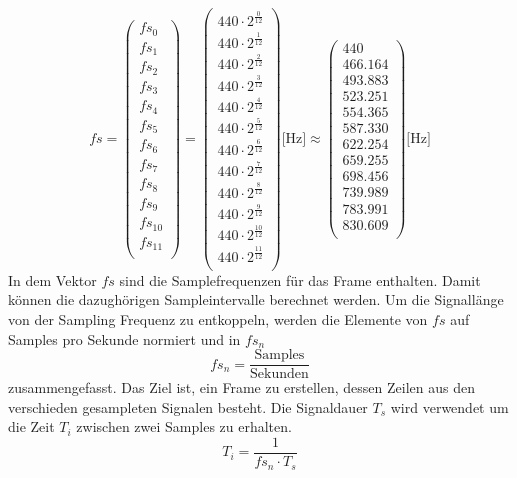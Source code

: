 \[
fs
=
 \begin{pmatrix}
fs_{0}\\[1mm]
fs_{1}\\[1mm]
fs_{2}\\[1mm]
fs_{3}\\[1mm]
fs_{4}\\[1mm]
fs_{5}\\[1mm]
fs_{6}\\[1mm]
fs_{7}\\[1mm]
fs_{8}\\[1mm]
fs_{9}\\[1mm]
fs_{10}\\[1mm]
fs_{11}\\[1mm]
\end{pmatrix}
=
\begin{pmatrix}
440\cdot2^{\frac{0}{12}}\\[0.5mm]
440\cdot2^{\frac{1}{12}}\\[0.5mm]
440\cdot2^{\frac{2}{12}}\\[0.5mm]
440\cdot2^{\frac{3}{12}}\\[0.5mm]
440\cdot2^{\frac{4}{12}}\\[0.5mm]
440\cdot2^{\frac{5}{12}}\\[0.5mm]
440\cdot2^{\frac{6}{12}}\\[0.5mm]
440\cdot2^{\frac{7}{12}}\\[0.5mm]
440\cdot2^{\frac{8}{12}}\\[0.5mm]
440\cdot2^{\frac{9}{12}}\\[0.5mm]
440\cdot2^{\frac{10}{12}}\\[0.5mm]
440\cdot2^{\frac{11}{12}}\\[0.5mm]
\end{pmatrix}
 \text{[Hz]}
 \approx
 \begin{pmatrix}
 440\\[1mm]
466.164\\[1mm]
493.883\\[1mm]
523.251\\[1mm]
554.365\\[1mm]
587.330\\[1mm]
622.254\\[1mm]
659.255\\[1mm]
698.456\\[1mm]
739.989\\[1mm]
783.991\\[1mm]
830.609\\[1mm]
 \end{pmatrix}
 \text{[Hz]} 
\]
In dem Vektor $fs$ sind die Samplefrequenzen für das Frame enthalten. Damit können die dazughörigen Sampleintervalle berechnet werden. Um die  Signallänge von der Sampling Frequenz zu entkoppeln, werden die Elemente von $fs$ auf Samples pro Sekunde normiert und in $fs_{n}$  
\[fs_{n} = \frac{\text{Samples}}{\text{Sekunden}}\]
zusammengefasst.
Das Ziel ist, ein Frame zu erstellen, dessen Zeilen aus den verschieden gesampleten Signalen besteht. Die Signaldauer $T_{s}$ wird verwendet um die Zeit $T_{i}$ zwischen zwei Samples zu erhalten.
\[T_{i}=\frac{1}{fs_{n}\cdot T_{s}}\]

